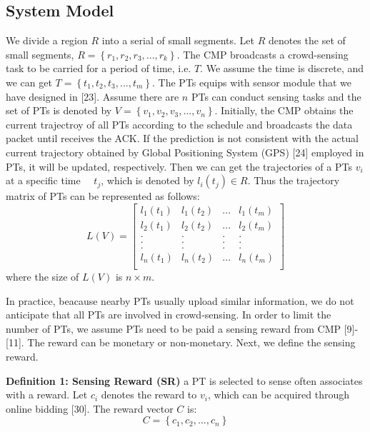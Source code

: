 \documentclass[journal]{IEEEtran}
\begin{document}
\subsection{System Model }
 We divide a region $R$ into a serial of small segments. Let $R$ denotes the set of small segments, $R=\left \{ r_{1},r_{2},r_{3},...,r_{k} \right \}$. The CMP broadcasts a crowd-sensing task to be carried for a period of time, i.e. $T$. We assume the time is discrete, and we can get $T=\left \{ t_{1},t_{2},t_{3},...,t_{m} \right \}$. The PTs equips with sensor module that we have designed in [23]. Assume there are $n$ PTs can conduct sensing tasks and the set of PTs is denoted by $V=\left \{ v_{1},v_{2},v_{3},...,v_{n}\right \}$. Initially, the CMP obtains the current trajectroy of all PTs according to the schedule and broadcasts the data packet until receives the ACK. If the prediction is not consistent with the actual current trajectory obtained by Global Positioning System (GPS) [24] employed in PTs, it will be updated, respectively. Then we can get the trajectories of a PTs $v_{i}$ at a specific time　 $t_{j}$, which is denoted by  $l_{i}(t_{j})\in R$. Thus the trajectory matrix of PTs can be represented as follows:
\setcounter{equation}{0}
\begin{equation}
L(V)=\begin{bmatrix}
l_{1}(t_{1})&l_{1}(t_{2})&... & l_{1}(t_{m})\\ 
l_{2}(t_{1})&l_{2}(t_{2})&... & l_{2}(t_{m})\\
.&. &.&.\\ 
.&. &.&.\\
.&. &.&.\\
l_{n}(t_{1})&l_{n}(t_{2})&... & l_{n}(t_{m})\\
\end{bmatrix}
\end{equation}
where the size of $L(V)$ is $n\times m$.


In practice, beacause nearby PTs usually upload similar information, we do not anticipate that all PTs are involved in crowd-sensing. In order to limit the number of PTs, we assume PTs need to be paid a sensing reward from CMP [9]-[11]. The reward can be monetary or non-monetary. Next, we define the sensing reward.

\noindent
\textbf{Definition 1: Sensing Reward (SR)} a PT is selected to sense often associates with a reward. Let $c_{i}$ denotes the reward to $v_{i}$, which can be acquired through online bidding [30]. The reward vector $C$ is:
\begin{equation}
C=\left \{c_{1},c_{2},...,c_{n} \right \}
\end{equation}
\end{document}
